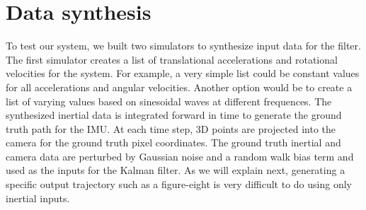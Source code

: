 \section{Data synthesis}
\label{Datasynth}
To test our system, we built two simulators to synthesize input data for the filter. The first simulator creates a list of translational accelerations and rotational velocities for the system. For example, a very simple list could be constant values for all accelerations and angular velocities. Another option would be to create a list of varying values based on sinesoidal waves at different frequences. The synthesized inertial data is integrated forward in time to generate the ground truth path for the IMU. At each time step, 3D points are projected into the camera for the ground truth pixel coordinates. The ground truth inertial and camera data are perturbed by Gaussian noise and a random walk bias term and used as the inputs for the Kalman filter. As we will explain next, generating a specific output trajectory such as a figure-eight is very difficult to do using only inertial inputs.

